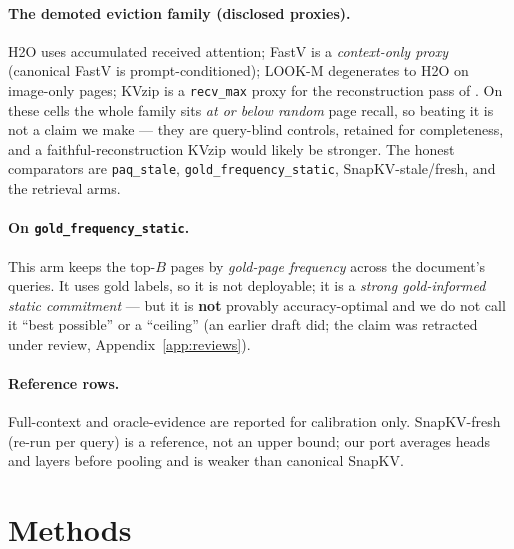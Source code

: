 \documentclass[11pt,letterpaper]{article}
\begin{document}
\paragraph{The demoted eviction family (disclosed proxies).} H2O uses accumulated received
attention; FastV is a \emph{context-only proxy} (canonical FastV is prompt-conditioned); LOOK-M
degenerates to H2O on image-only pages; KVzip is a \texttt{recv\_max} proxy for the reconstruction
pass of \citet{kim2025kvzip}. On these cells the whole family sits \emph{at or below random} page
recall, so beating it is not a claim we make --- they are query-blind controls, retained for
completeness, and a faithful-reconstruction KVzip would likely be stronger. The honest comparators
are \texttt{paq\_stale}, \texttt{gold\_frequency\_static}, SnapKV-stale/fresh, and the retrieval
arms.

\paragraph{On \texttt{gold\_frequency\_static}.} This arm keeps the top-$B$ pages by
\emph{gold-page frequency} across the document's queries. It uses gold labels, so it is not
deployable; it is a \emph{strong gold-informed static commitment} --- but it is \textbf{not}
provably accuracy-optimal and we do not call it ``best possible'' or a ``ceiling'' (an earlier
draft did; the claim was retracted under review, Appendix~\ref{app:reviews}).

\paragraph{Reference rows.} Full-context and oracle-evidence are reported for calibration only.
SnapKV-fresh (re-run per query) is a reference, not an upper bound; our port averages heads and
layers before pooling and is weaker than canonical SnapKV.

\section{Methods}\label{sec:method}
\end{document}
